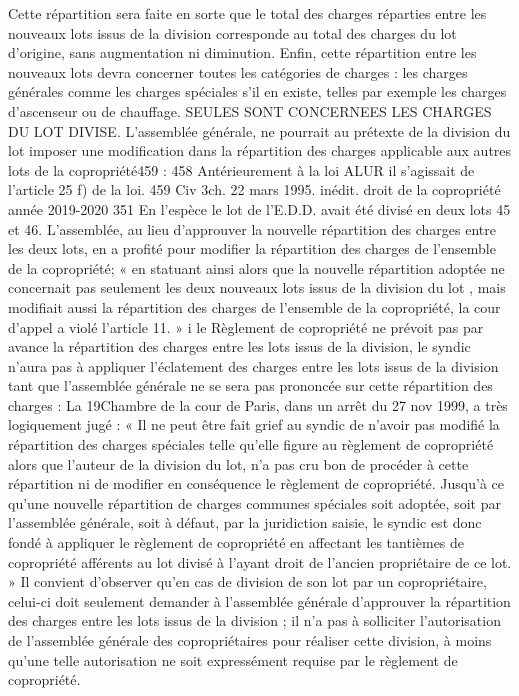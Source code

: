 Cette répartition sera faite en sorte que le total des charges réparties entre les nouveaux lots issus de la division corresponde au total des charges du lot d'origine, sans augmentation ni diminution.
Enfin, cette répartition entre les nouveaux lots devra concerner toutes les catégories de charges : les charges générales comme les charges spéciales s'il en existe, telles par exemple les charges d'ascenseur ou de chauffage.
SEULES SONT CONCERNEES LES CHARGES DU LOT DIVISE.
L’assemblée générale, ne pourrait au prétexte de la division du lot imposer une modification dans la répartition des charges applicable aux autres lots de la copropriété459 :
458 Antérieurement à la loi ALUR il s’agissait de l’article 25 f) de la loi.
459 Civ 3\degres ch. 22 mars 1995. inédit.
droit de la copropriété année 2019-2020
351
En l’espèce le lot  de l’E.D.D. avait été divisé en deux lots 45 et 46. L’assemblée, au lieu d’approuver la nouvelle répartition des charges entre les deux lots, en a profité pour modifier la répartition des charges de l’ensemble de la copropriété; « en statuant ainsi alors que la nouvelle répartition adoptée ne concernait pas seulement les deux nouveaux lots issus de la division du lot , mais modifiait aussi la répartition des charges de l’ensemble de la copropriété, la cour d’appel a violé l’article 11. »
i le Règlement de copropriété ne prévoit pas par avance la répartition des charges entre les lots issus de la division, le syndic n’aura pas à appliquer l’éclatement des charges entre les lots issus de la division tant que l'assemblée générale ne se sera pas prononcée sur cette répartition des charges :
La 19\degres Chambre de la cour de Paris, dans un arrêt du 27 nov 1999, a très logiquement jugé :
« Il ne peut être fait grief au syndic de n'avoir pas modifié la répartition des charges spéciales telle qu'elle figure au règlement de copropriété alors que l'auteur de la division du lot, n'a pas cru bon de procéder à cette répartition ni de modifier en conséquence le règlement de copropriété. Jusqu'à ce qu'une nouvelle répartition de charges communes spéciales soit adoptée, soit par l'assemblée générale, soit à défaut, par la juridiction saisie, le syndic est donc fondé à appliquer le règlement de copropriété en affectant les tantièmes de copropriété afférents au lot divisé à l'ayant droit de l'ancien propriétaire de ce lot. »
Il convient d’observer qu’en cas de division de son lot par un copropriétaire, celui-ci doit seulement demander à l’assemblée générale d’approuver la répartition des charges entre les lots issus de la division ; il n’a pas à solliciter l’autorisation de l’assemblée générale des copropriétaires pour réaliser cette division, à moins qu’une telle autorisation ne soit expressément requise par le règlement de copropriété.
